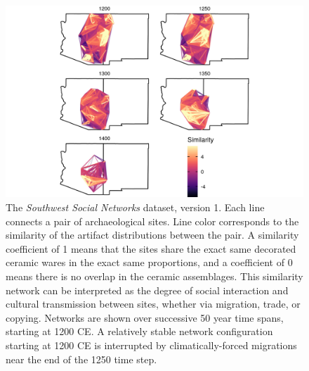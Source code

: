 \documentclass[fleqn,10pt]{wlscirep}
\begin{document}
\begin{figure}[!ht]
\centering
\includegraphics[width=.8\linewidth]{figures/similarity_network.png}
\caption{The \emph{Southwest Social Networks} dataset, version 1. Each line connects a pair of archaeological sites. Line color corresponds to the similarity of the artifact distributions between the pair. A similarity coefficient of 1 means that the sites share the exact same decorated ceramic wares in the exact same proportions, and a coefficient of 0 means there is no overlap in the ceramic assemblages. This similarity network can be interpreted as the degree of social interaction and cultural transmission between sites, whether via migration, trade, or copying. Networks are shown over successive 50 year time spans, starting at 1200 CE. A relatively stable network configuration starting at 1200 CE is interrupted by climatically-forced migrations near the end of the 1250 time step.}
\label{fig:network-plot}
\end{figure}
\end{document}
